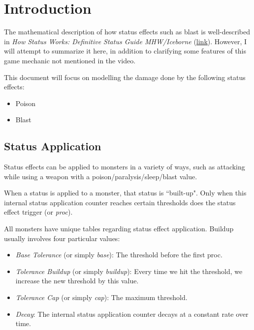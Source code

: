 \documentclass{article}
\begin{document}
\thispagestyle{plain}
\MakeCustomTitle
\bigskip



\begin{center}%
\begin{minipage}[c]{12cm}%
    \doclicenseThis%
\end{minipage}%
\end{center}%
\bigskip


\section{Introduction}%
\label{sec:introduction}

The mathematical description of how status effects such as blast is well-described in \textit{How Status Works: Definitive Status Guide MHW/Iceborne} (\href{https://www.youtube.com/watch?v=iIPfkvvbGwY}{link}). However, I will attempt to summarize it here, in addition to clarifying some features of this game mechanic not mentioned in the video.

This document will focus on modelling the damage done by the following status effects:
\begin{itemize}
    \item Poison
    \item Blast
\end{itemize}

\subsection{Status Application}%
\label{sub:blast_application}

Status effects can be applied to monsters in a variety of ways, such as attacking while using a weapon with a poison/paralysis/sleep/blast value.

When a status is applied to a monster, that status is ``built-up". Only when this internal status application counter reaches certain thresholds does the status effect trigger (or \textit{proc}).

All monsters have unique tables regarding status effect application. Buildup usually involves four particular values:

\begin{itemize}
    \item \textit{Base Tolerance} (or simply \textit{base}): The threshold before the first proc.
    \item \textit{Tolerance Buildup} (or simply \textit{buildup}): Every time we hit the threshold, we increase the new threshold by this value.
    \item \textit{Tolerance Cap} (or simply \textit{cap}): The maximum threshold.
    \item \textit{Decay}: The internal status application counter decays at a constant rate over time.
\end{itemize}
\end{document}
